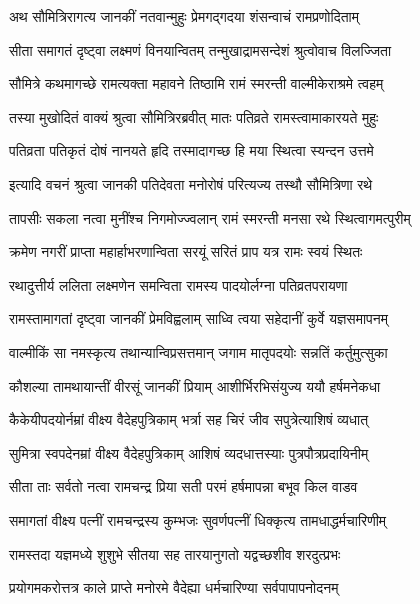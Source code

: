 

\twolineshloka
{अथ सौमित्रिरागत्य जानकीं नतवान्मुहुः}
{प्रेमगद्गदया शंसन्वाचं रामप्रणोदिताम्}%

\twolineshloka
{सीता समागतं दृष्ट्वा लक्ष्मणं विनयान्वितम्}
{तन्मुखाद्रामसन्देशं श्रुत्वोवाच विलज्जिता}%

\twolineshloka
{सौमित्रे कथमागच्छे रामत्यक्ता महावने}
{तिष्ठामि रामं स्मरन्ती वाल्मीकेराश्रमे त्वहम्}%

\twolineshloka
{तस्या मुखोदितं वाक्यं श्रुत्वा सौमित्रिरब्रवीत्}
{मातः पतिव्रते रामस्त्वामाकारयते मुहुः}%

\twolineshloka
{पतिव्रता पतिकृतं दोषं नानयते हृदि}
{तस्मादागच्छ हि मया स्थित्वा स्यन्दन उत्तमे}%

\twolineshloka
{इत्यादि वचनं श्रुत्वा जानकी पतिदेवता}
{मनोरोषं परित्यज्य तस्थौ सौमित्रिणा रथे}%

\twolineshloka
{तापसीः सकला नत्वा मुनींश्च निगमोज्ज्वलान्}
{रामं स्मरन्ती मनसा रथे स्थित्वागमत्पुरीम्}%

\twolineshloka
{क्रमेण नगरीं प्राप्ता महार्हाभरणान्विता}
{सरयूं सरितं प्राप यत्र रामः स्वयं स्थितः}%

\twolineshloka
{रथादुत्तीर्य ललिता लक्ष्मणेन समन्विता}
{रामस्य पादयोर्लग्ना पतिव्रतपरायणा}%

\twolineshloka
{रामस्तामागतां दृष्ट्वा जानकीं प्रेमविह्वलाम्}
{साध्वि त्वया सहेदानीं कुर्वे यज्ञसमापनम्}%

\twolineshloka
{वाल्मीकिं सा नमस्कृत्य तथान्यान्विप्रसत्तमान्}
{जगाम मातृपदयोः सन्नतिं कर्तुमुत्सुका}%

\twolineshloka
{कौशल्या तामथायान्तीं वीरसूं जानकीं प्रियाम्}
{आशीर्भिरभिसंयुज्य ययौ हर्षमनेकधा}%

\twolineshloka
{कैकेयीपदयोर्नम्रां वीक्ष्य वैदेहपुत्रिकाम्}
{भर्त्रा सह चिरं जीव सपुत्रेत्याशिषं व्यधात्}%

\twolineshloka
{सुमित्रा स्वपदेनम्रां वीक्ष्य वैदेहपुत्रिकाम्}
{आशिषं व्यदधात्तस्याः पुत्रपौत्रप्रदायिनीम्}%

\twolineshloka
{सीता ताः सर्वतो नत्वा रामचन्द्र प्रिया सती}
{परमं हर्षमापन्ना बभूव किल वाडव}%

\twolineshloka
{समागतां वीक्ष्य पत्नीं रामचन्द्रस्य कुम्भजः}
{सुवर्णपत्नीं धिक्कृत्य तामधाद्धर्मचारिणीम्}%

\twolineshloka
{रामस्तदा यज्ञमध्ये शुशुभे सीतया सह}
{तारयानुगतो यद्वच्छशीव शरदुत्प्रभः}%

\twolineshloka
{प्रयोगमकरोत्तत्र काले प्राप्ते मनोरमे}
{वैदेह्या धर्मचारिण्या सर्वपापापनोदनम्}%

